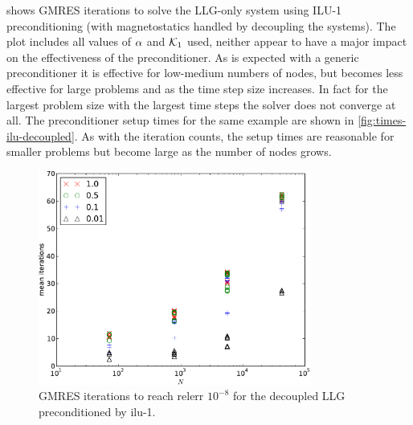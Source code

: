 



 shows GMRES iterations to solve the LLG-only system using ILU-1 preconditioning (with magnetostatics handled by decoupling the systems).
The plot includes all values of $\alpha$ and $\mathcal{K}_1$ used, neither appear to have a major impact on the effectiveness of the preconditioner.
As is expected with a generic preconditioner it is effective for low-medium numbers of nodes, but becomes less effective for large problems and as the time step size increases.
In fact for the largest problem size with the largest time steps the solver does not converge at all.
The preconditioner setup times for the same example are shown in \cref{fig:times-ilu-decoupled}.
As with the iteration counts, the setup times are reasonable for smaller problems but become large as the number of nodes grows.

\begin{figure}
  \centering
  \includegraphics[width=0.8\textwidth]{plots/linear_solvers/ilu-1decoupleddummy-meanofnsolveritersvsinitialnnode.pdf}
  \caption{GMRES iterations to reach relerr $10^{-8}$ for the decoupled LLG preconditioned by ilu-1.}
  \label{fig:its-ilu-decoupled}
\end{figure}

